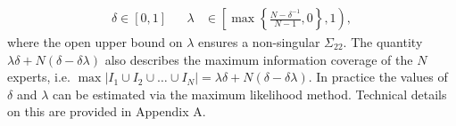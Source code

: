 \documentclass[11pt]{article}
\theoremstyle{definition}
\theoremstyle{definition}
\begin{document}
\begin{align}
\delta \in [0,1] &&  \lambda &\in \left[  \max \left\{ \frac{N-\delta^{-1}}{N-1}, 0\right\}, 1 \right), \label{rhoDomain}
\end{align}
where the open upper bound on $\lambda$ ensures a non-singular $\Sigma_{22}$. The quantity  $\lambda\delta + N(\delta - \delta\lambda)$ also describes the maximum information coverage of the $N$ experts, i.e. $\max | I_1 \cup I_2 \cup \dots \cup I_N| = \lambda\delta + N(\delta - \delta\lambda)$. In practice the values of $\delta$ and $\lambda$ can be estimated via the maximum likelihood method. Technical details on this are provided in Appendix A.  


\end{document}
